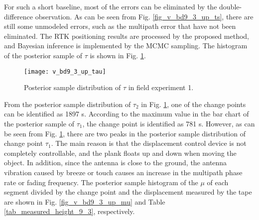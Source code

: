\documentclass[final,3p,times]{elsarticle}
\begin{document}
	For such a short baseline, most of the errors can be eliminated by the double-difference observation. 
	As can be seen from Fig. \ref{fig_v_bd9_3_up_ts}, there are still some unmodeled errors, such as the multipath error that have not been eliminated. 
	The RTK positioning results are processed by the proposed method, and Bayesian inference is implemented by the MCMC sampling. 
	The histogram of the posterior sample of $\tau$ is shown in Fig. \ref{fig_v_bd9_3_up_tau}.
	
	\begin{figure}[htbp]
		\centering
		\texttt{[image: v\_bd9\_3\_up\_tau]}
		\caption{Posterior sample distribution of $\tau$ in field experiment 1.}
		\label{fig_v_bd9_3_up_tau}
	\end{figure} 
	From the posterior sample distribution of $\tau_2$ in Fig. \ref{fig_v_bd9_3_up_tau}, one of the change points can be identified as 1897 s. 
	According to the maximum value in the bar chart of the posterior sample of $\tau_1$, the change point is identified as 781 s.
	However, as can be seen from Fig. \ref{fig_v_bd9_3_up_tau}, there are two peaks in the posterior sample distribution of change point $\tau_1$.
	The main reason is that the displacement control device is not completely controllable, and the plank floats up and down when moving the object. 
	In addition, since the antenna is close to the ground, the antenna vibration caused by breeze or touch causes an increase in the multipath phase rate or fading frequency\cite{kelly2003characterization}. 
	The posterior sample histogram of the $\mu$ of each segment divided by the change point and the displacement measured by the tape are shown in Fig. \ref{fig_v_bd9_3_up_mu} and Table \ref{tab_measured_height_9_3}, respectively.
	
\end{document}
